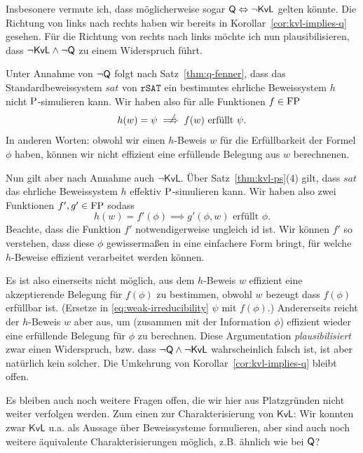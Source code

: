 Insbesonere vermute ich, dass möglicherweise sogar $\hQ\Leftrightarrow\neg\mathsf{KvL}$ gelten könnte. Die Richtung von links nach rechts haben wir bereits in Korollar~\ref{cor:kvl-implies-q} gesehen. Für die Richtung von rechts nach links möchte ich nun plausibilisieren, dass $\neg\mathsf{KvL}\land\neg\hQ$ zu einem Widerspruch führt.

Unter Annahme von $\neg\hQ$ folgt nach Satz~\ref{thm:q-fenner}, dass das Standardbeweissystem $\mathit{sat}$ von $\mathtt{rSAT}$ ein bestimmtes ehrliche Beweissystem $h$ nicht $\P$-simulieren kann.
Wir haben also für alle Funktionen $f\in\FP$ 
\begin{equation} h(w)=\psi \rlap{\hspace*{2pt}\raisebox{2.3pt}{$\quad\not$}}\implies  \text{$f(w)$ erfüllt $\psi$}.\label{eq:weak-irreducibility} \end{equation}
In anderen Worten: obwohl wir einen $h$-Beweis $w$ für die Erfüllbarkeit der Formel $\phi$ haben, können wir nicht effizient eine erfüllende Belegung aus $w$ berechnenen.

Nun gilt aber nach Annahme auch $\neg\mathsf{KvL}$. Über Satz~\ref{thm:kvl-ps}(4) gilt, dass $\mathit{sat}$ das ehrliche Beweissystem $h$ effektiv $\P$-simulieren kann. Wir haben also zwei Funktionen $f', g'\in\FP$ sodass
\begin{equation}\label{eq:effective-simulation} h(w)=f'(\phi) \implies \text{$g'(\phi, w)$ erfüllt $\phi$}. \end{equation}
Beachte, dass die Funktion $f'$ notwendigerweise ungleich $\mathrm{id}$ ist. Wir können $f'$ so verstehen, dass diese $\phi$ gewissermaßen in eine einfachere Form bringt, für welche $h$-Beweise effizient verarbeitet werden können.

Es ist also einerseits nicht möglich, aus dem $h$-Beweis $w$ effizient eine akzeptierende Belegung für $f(\phi)$ zu bestimmen, obwohl $w$ bezeugt dass $f(\phi)$ erfüllbar ist. (Ersetze in \eqref{eq:weak-irreducibility} $\psi$ mit $f(\phi)$.)
Andererseits reicht der $h$-Beweis $w$ aber aus, um (zusammen mit der Information $\phi$) effizient wieder eine erfüllende Belegung für $\phi$ zu berechnen. 
Diese Argumentation \emph{plausibilisiert} zwar einen Widerspruch, bzw. dass $\neg\hQ\land\neg\mathsf{KvL}$ wahrscheinlich falsch ist, ist aber natürlich kein solcher. Die Umkehrung von Korollar~\ref{cor:kvl-implies-q} bleibt offen.

Es bleiben auch noch weitere Fragen offen, die wir hier aus Platzgründen nicht weiter verfolgen werden. 
Zum einen zur Charakterisierung von $\mathsf{KvL}$:
Wir konnten zwar $\mathsf{KvL}$ u.a. als Aussage über Beweissysteme formulieren, aber sind auch noch weitere äquivalente Charakterisierungen möglich, z.B. ähnlich wie bei $\hQ$?

